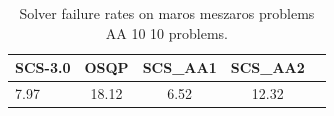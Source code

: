 \begin{table}
\centering
\caption{Solver failure rates on maros meszaros problems AA 10 10 problems.}
\label{t-maros meszaros problems AA 10 10-failure}
\begin{tabular}{lcccc}
\toprule
 SCS-3.0 &  OSQP &  SCS\_AA1 &  SCS\_AA2 \\
\midrule
    7.97 & 18.12 &     6.52 &    12.32 \\
\bottomrule
\end{tabular}
\end{table}
